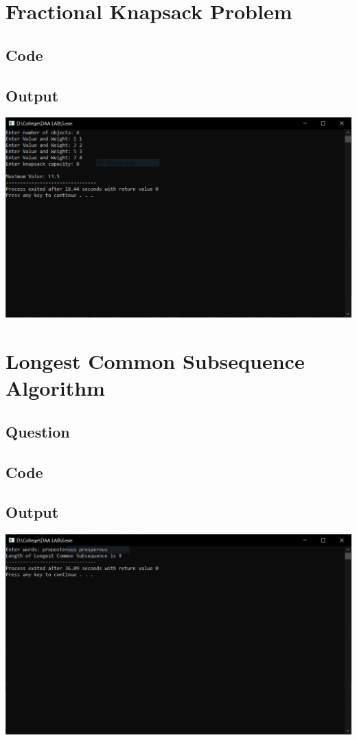 \documentclass[11pt]{article}
\begin{document}
\section{Fractional Knapsack Problem}
	\subsection{Code}
		
	\subsection{Output}
		\includegraphics[scale=0.7]{pic/5.png}
\newpage








\section{Longest Common Subsequence Algorithm}
	\subsection{Question}
	\subsection{Code}
		
	\subsection{Output}
		\includegraphics[scale=0.7]{pic/6.png}
\newpage
\end{document}
